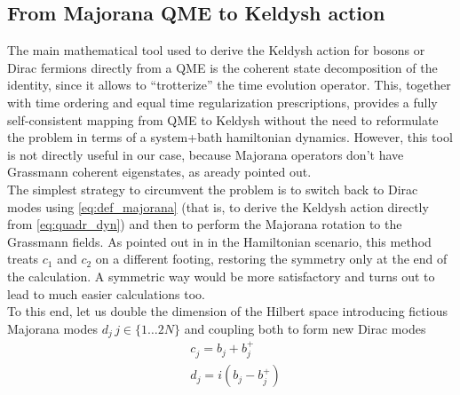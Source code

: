 \documentclass[a4paper,11pt]{article}
\theoremstyle{remark}
\begin{document}
  \subsection{From Majorana QME to Keldysh action}
  The main mathematical tool used to derive the Keldysh action for bosons or Dirac fermions directly from a QME is the coherent state decomposition of the identity, since it allows to ``trotterize'' the time evolution operator. This, together with time ordering and equal time regularization prescriptions, provides a fully self-consistent mapping from QME to Keldysh without the need to reformulate the problem in terms of a system+bath hamiltonian dynamics. However, this tool is not directly useful in our case, because Majorana operators don't have Grassmann coherent eigenstates, as aready pointed out.\\ The simplest strategy to circumvent the problem is to switch back to Dirac modes using \eqref{eq:def_majorana} (that is, to derive the Keldysh action directly from \eqref{eq:quadr_dyn}) and then to perform the Majorana rotation to the Grassmann fields. As pointed out in \cite{Nilsson2013} in the Hamiltonian scenario, this method treats $c_1$ and $c_2$ on a different footing, restoring the symmetry only at the end of the calculation. A symmetric way would be more satisfactory and turns out to lead to much easier calculations too.\\ To this end, let us double the dimension of the Hilbert space introducing fictious Majorana modes $d_j\,j\in\{1\dots2N\}$ and coupling both to form new Dirac modes
  \begin{equation}
   \label{eq:def_majorana_doubling}
   \begin{aligned}
   &c_j^{ } = b_j^{ }+b_j^+\\
   &d_j^{ } = i\left(b^{ }_j - b^{+}_j\right)
   \end{aligned}
  \end{equation}
\end{document}
